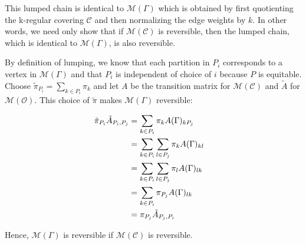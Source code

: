 This lumped chain is identical to $\mathcal{M} ( \Gamma )$ which is obtained by first quotienting the k-regular covering $\mathcal{C}$ and then normalizing the edge weights by $k$. In other words, we need only show that if $\mathcal{M} (\mathcal{C} )$ is reversible, then the lumped chain, which is identical to $\mathcal{M} ( \Gamma )$, is also reversible.

By definition of lumping, we know that each partition in $P_i$ corresponds to a vertex in $\mathcal{M} ( \Gamma )$ and that $P_i$ is independent of choice of $i$ because $P$ is equitable. Choose $\tilde{ \pi }_{P_i} = \sum_{k \in P_i} \pi_k$ and let $A$ be the transition matrix for $\mathcal{M} ( \mathcal{C} )$ and $\tilde {A}$ for $\mathcal{M} ( \mathcal{ O } )$. This choice of $\tilde{ \pi }$ makes $\mathcal{M} ( \Gamma )$ reversible:

\begin{align}
  \tilde{ \pi }_{P_i} \tilde{A}_{P_i, P_j} &= \sum_{k \in P_i} \pi_k A(\Gamma)_{k P_j} \cr
              &= \sum_{k \in P_i} \sum_{l \in P_j} \pi_k A(\Gamma)_{kl } \cr
              &= \sum_{k \in P_i} \sum_{l \in P_j} \pi_{ l } A(\Gamma)_{lk} \cr
              &= \sum_{k \in P_i} \pi_{P_j} A(\Gamma)_{ lk } \cr
              &= \pi_{P_j} \tilde{A}_{P_j, P_i}
\end{align}

Hence, $\mathcal{M}( \Gamma )$ is reversible if $\mathcal{M} ( \mathcal{C} )$ is reversible.